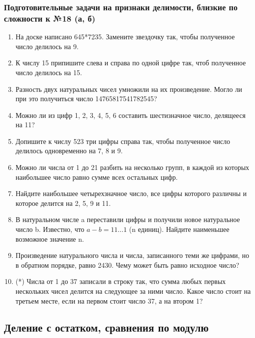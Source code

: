 \documentclass[12pt]{article}
\begin{document}
 \subsubsection*{Подготовительные задачи на признаки делимости, близкие по сложности к №18 (а, б)}
   \begin{enumerate}[start=1,label={\itshape\bfseries \arabic*.}]
 	\item На доске написано 645*7235. Замените звездочку так, чтобы полученное число делилось на 9.
	\item К числу 15 припишите слева и справа по одной цифре так, чтоб полученное число делилось на 15.
	\item Разность двух натуральных чисел умножили на их произведение. Могло ли при это получиться число 14765817541782545?
	\item Можно ли из цифр 1, 2, 3, 4, 5, 6 составить шестизначное число, делящееся на 11?
	\item Допишите к числу 523 три цифры справа так, чтобы полученное число делилось одновременно на 7, 8 и 9.
	\item Можно ли числа от 1 до 21 разбить на несколько групп, в каждой из которых наибольшее число равно сумме всех остальных цифр.
	\item Найдите наибольшее четырехзначное число, все цифры которого различны и которое делится на 2, 5, 9 и 11.
	\item В натуральном числе a переставили цифры и получили новое натуральное число b. Известно, что $a - b = 11\ldots1$ (n единиц). Найдите наименьшее возможное значение n.
	\item Произведение натурального числа и числа, записанного теми же цифрами, но в обратном порядке, равно 2430. Чему может быть равно исходное число?
	\item (*) Числа от 1 до 37 записали в строку так, что сумма любых первых нескольких чисел делится на следующее за ними число. Какое число стоит на третьем месте, если на первом стоит число 37, а на втором 1?
 \end{enumerate}







\subsection{Деление с остатком, сравнения по модулю}
\end{document}
